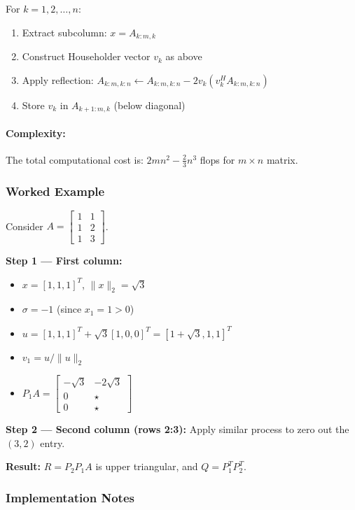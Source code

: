 For $k = 1, 2, \ldots, n$:
\begin{enumerate}
    \item Extract subcolumn: $x = A_{k:m,k}$
    \item Construct Householder vector $v_k$ as above
    \item Apply reflection: $A_{k:m,k:n} \leftarrow A_{k:m,k:n} - 2v_k(v_k^H A_{k:m,k:n})$
    \item Store $v_k$ in $A_{k+1:m,k}$ (below diagonal)
\end{enumerate}

\paragraph{Complexity:}
The total computational cost is: $2mn^2 - \frac{2}{3}n^3$ flops for $m \times n$ matrix.

\subsubsection{Worked Example}

Consider $A = \begin{bmatrix} 1 & 1 \\ 1 & 2 \\ 1 & 3 \end{bmatrix}$.

\textbf{Step 1 — First column:}
\begin{itemize}
    \item $x = [1, 1, 1]^T$, $\|x\|_2 = \sqrt{3}$
    \item $\sigma = -1$ (since $x_1 = 1 > 0$)
    \item $u = [1, 1, 1]^T + \sqrt{3}[1, 0, 0]^T = [1+\sqrt{3}, 1, 1]^T$
    \item $v_1 = u/\|u\|_2$
    \item $P_1 A = \begin{bmatrix} -\sqrt{3} & -2\sqrt{3} \\ 0 & \star \\ 0 & \star \end{bmatrix}$
\end{itemize}

\textbf{Step 2 — Second column (rows 2:3):}
Apply similar process to zero out the $(3,2)$ entry.

\textbf{Result:} $R = P_2 P_1 A$ is upper triangular, and $Q = P_1^T P_2^T$.

\subsubsection{Implementation Notes}

